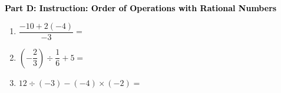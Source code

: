 \documentclass[12pt, letterpaper, fleqn]{article}
\begin{document}
\newpage

\begin{tcolorbox}[colback=customteal!20]
\large\textcolor{black}{\textbf{Part D: Instruction: Order of Operations with Rational Numbers}}
\end{tcolorbox}

\vspace{3mm}

\begin{enumerate}[itemsep=2.2cm, leftmargin=0.6cm, resume]
\item $\dfrac{-10 + 2(-4)}{-3} =$
\item $\left(-\dfrac{2}{3}\right) \div \dfrac{1}{6} + 5 =$
\item $12 \div (-3) - (-4) \times (-2) =$
\end{enumerate}
\end{document}
